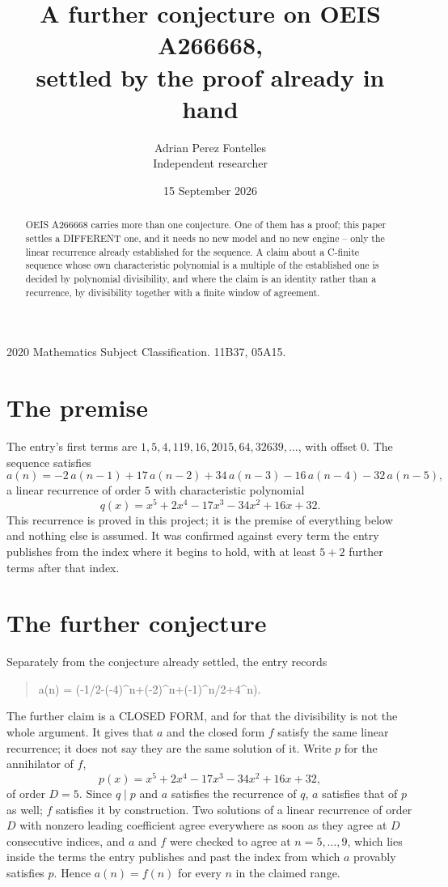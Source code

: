 \documentclass[11pt,a4paper]{article}
\title{A further conjecture on OEIS A266668,\\ \large settled by the proof already in hand}
\author{Adrian Perez Fontelles\\ \small Independent researcher}
\date{15 September 2026}
\theoremstyle{plain}
\theoremstyle{definition}
\begin{document}
\maketitle

\begin{abstract}
OEIS A266668 carries more than one conjecture. One of them has a proof; this paper settles a
DIFFERENT one, and it needs no new model and no new engine -- only the linear recurrence already
established for the sequence. A claim about a C-finite sequence whose own characteristic
polynomial is a multiple of the established one is decided by polynomial divisibility, and where
the claim is an identity rather than a recurrence, by divisibility together with a finite window
of agreement.
\end{abstract}

\noindent\small 2020 Mathematics Subject Classification. 11B37, 05A15.\normalsize

\section{The premise}

The entry's first terms are $1, 5, 4, 119, 16, 2015, 64, 32639,\dots$, with offset $0$. The sequence satisfies
\[
  a(n)=-2\,a(n-1) + 17\,a(n-2) + 34\,a(n-3) - 16\,a(n-4) - 32\,a(n-5) ,
\]
a linear recurrence of order $5$ with characteristic polynomial
\[
  q(x)=x^{5} + 2 x^{4} - 17 x^{3} - 34 x^{2} + 16 x + 32 .
\]
This recurrence is proved in this project; it is the premise of everything below and nothing else is assumed.
It was confirmed against every term the entry publishes from the index where it begins to hold,
with at least $5+2$ further terms after that index.

\section{The further conjecture}

Separately from the conjecture already settled, the entry records

\begin{quote}\raggedright a(n) = (-1/2-(-4)\^{}n+(-2)\^{}n+(-1)\^{}n/2+4\^{}n).\end{quote}

The further claim is a CLOSED FORM, and for that the divisibility is not the whole argument. It
gives that $a$ and the closed form $f$ satisfy the same linear recurrence; it does not say they
are the same solution of it. Write $p$ for the annihilator of $f$,
\[
  p(x)=x^{5} + 2 x^{4} - 17 x^{3} - 34 x^{2} + 16 x + 32 ,
\]
of order $D=5$. Since $q\mid p$ and $a$ satisfies the recurrence of $q$, $a$ satisfies that of
$p$ as well; $f$ satisfies it by construction. Two solutions of a linear recurrence of order $D$
with nonzero leading coefficient agree everywhere as soon as they agree at $D$ consecutive
indices, and $a$ and $f$ were checked to agree at $n=5,\dots,9$,
which lies inside the terms the entry publishes and past the index from which $a$ provably
satisfies $p$. Hence $a(n)=f(n)$ for every $n$ in the claimed range.
\end{document}
